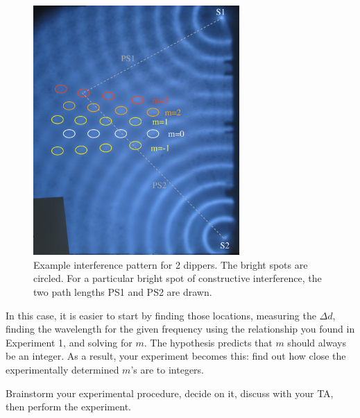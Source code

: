 \begin{figure}
	\centering
	\includegraphics[width=0.7\textwidth]{ripple-tank/interference-2d.png}
	\caption{Example interference pattern for 2 dippers. The bright spots are circled. For a particular bright spot of constructive interference, the two path lengths PS1 and PS2 are drawn.}\label{rt:fig:interference-2d}
\end{figure}

In this case, it is easier to start by finding those locations, measuring the $\Delta d$, finding the wavelength for the given frequency using the relationship you found in Experiment 1, and solving for $m$. The hypothesis predicts that $m$ should always be an integer. As a result, your experiment becomes this: find out how close the experimentally determined $m$'s are to integers.

Brainstorm your experimental procedure, decide on it, discuss with your TA, then perform the experiment.

